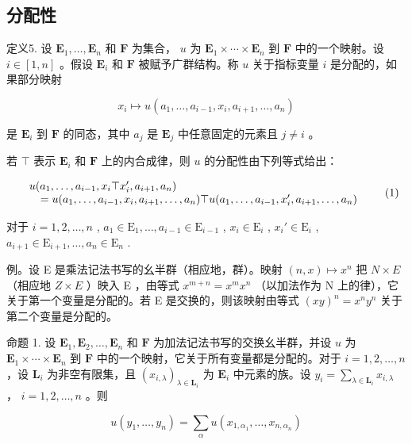 \subsection{分配性}

定义5. 设 \(\mathbf{E}_1, \ldots, \mathbf{E}_n\) 和 \(\mathbf{F}\) 为集合， \(u\) 为 \(\mathbf{E}_1 \times \cdots \times \mathbf{E}_n\) 到 \(\mathbf{F}\) 中的一个映射。设 \(i \in [1, n]\) 。假设 \(\mathbf{E}_i\) 和 \(\mathbf{F}\) 被赋予广群结构。称 \(u\) 关于指标变量 \(i\) 是分配的，如果部分映射

\[
x _ {i} \mapsto u (a _ {1}, \dots , a _ {i - 1}, x _ {i}, a _ {i + 1}, \dots , a _ {n})
\]

是 \(\mathbf{E}_i\) 到 \(\mathbf{F}\) 的同态，其中 \(a_j\) 是 \(\mathbf{E}_j\) 中任意固定的元素且 \(j \neq i\) 。

若 \(\top\) 表示 \(\mathbf{E}_i\) 和 \(\mathbf{F}\) 上的内合成律，则 \(u\) 的分配性由下列等式给出：

\[
\begin{array}{r l} & u (a _ {1}, \dots , a _ {i - 1}, x _ {i} \top x _ {i} ^ {\prime}, a _ {i + 1}, a _ {n}) \\ & \quad = u (a _ {1}, \dots , a _ {i - 1}, x _ {i}, a _ {i + 1}, \dots , a _ {n}) \top u (a _ {1}, \dots , a _ {i - 1}, x _ {i} ^ {\prime}, a _ {i + 1}, \dots , a _ {n}) \end{array}\tag{1}
\]

对于 \(i = 1, 2, \ldots, n\) , \(a_1 \in \mathrm{E}_1, \ldots, a_{i-1} \in \mathrm{E}_{i-1}\) , \(x_i \in \mathrm{E}_i\) , \(x_i' \in \mathrm{E}_i\) , \(a_{i+1} \in \mathrm{E}_{i+1}, \ldots, a_n \in \mathrm{E}_n\) .

例。设 E 是乘法记法书写的幺半群（相应地，群）。映射 \((n, x) \mapsto x^{n}\) 把 \(N \times E\) （相应地 \(Z \times E\) ）映入 E ，由等式 \(x^{m+n} = x^{m}x^{n}\) （以加法作为 N 上的律），它关于第一个变量是分配的。若 E 是交换的，则该映射由等式 \((xy)^{n} = x^{n}y^{n}\) 关于第二个变量是分配的。

命题 1. 设 \(\mathbf{E}_1, \mathbf{E}_2, \ldots, \mathbf{E}_n\) 和 \(\mathbf{F}\) 为加法记法书写的交换幺半群，并设 \(u\) 为 \(\mathbf{E}_1 \times \cdots \times \mathbf{E}_n\) 到 \(\mathbf{F}\) 中的一个映射，它关于所有变量都是分配的。对于 \(i = 1, 2, \ldots, n\) ，设 \(\mathbf{L}_i\) 为非空有限集，且 \((x_{i,\lambda})_{\lambda \in \mathbf{L}_i}\) 为 \(\mathbf{E}_i\) 中元素的族。设 \(y_i = \sum_{\lambda \in \mathbf{L}_i} x_{i,\lambda}\) ， \(i = 1, 2, \ldots, n\) 。则

\[
u (y _ {1}, \dots , y _ {n}) = \sum_ {\alpha} u (x _ {1, \alpha_ {1}}, \dots , x _ {n, \alpha_ {n}})\tag{2}
\]

